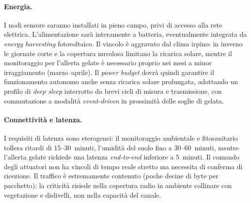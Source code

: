\paragraph{Energia.} I nodi sensore saranno installati in pieno campo, privi di accesso alla rete elettrica. L'alimentazione sarà interamente a batteria, eventualmente integrata da \textit{energy harvesting} fotovoltaico. Il vincolo è aggravato dal clima irpino: in inverno le giornate corte e la copertura nuvolosa limitano la ricarica solare, mentre il monitoraggio per l'allerta gelate è necessario proprio nei mesi a minor irraggiamento (marzo--aprile). Il \textit{power budget} dovrà quindi garantire il funzionamento autonomo anche senza ricarica solare prolungata, adottando un profilo di \textit{deep sleep} interrotto da brevi cicli di misura e trasmissione, con commutazione a modalità \textit{event-driven} in prossimità delle soglie di gelata.

\paragraph{Connettività e latenza.} I requisiti di latenza sono eterogenei: il monitoraggio ambientale e fitosanitario tollera ritardi di 15--30~minuti, l'umidità del suolo fino a 30--60~minuti, mentre l'allerta gelate richiede una latenza \textit{end-to-end} inferiore a 5~minuti. Il comando degli attuatori non ha vincoli di tempo reale stretto ma necessita di conferma di ricezione. Il traffico è estremamente contenuto (poche decine di byte per pacchetto); la criticità risiede nella copertura radio in ambiente collinare con vegetazione e dislivelli, non nella capacità del canale.

